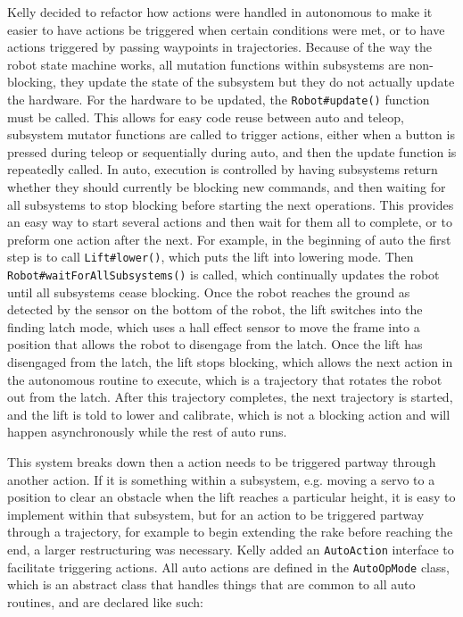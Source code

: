\documentclass{article}
\begin{document}
Kelly decided to refactor how actions were handled in autonomous to make it easier to have actions be triggered when certain conditions were met, or to have actions triggered by passing waypoints in trajectories. Because of the way the robot state machine works, all mutation functions within subsystems are non-blocking, they update the state of the subsystem but they do not actually update the hardware. For the hardware to be updated, the \texttt{Robot\#update()} function must be called. This allows for easy code reuse between auto and teleop, subsystem mutator functions are called to trigger actions, either when a button is pressed during teleop or sequentially during auto, and then the update function is repeatedly called. In auto, execution is controlled by having subsystems return whether they should currently be blocking new commands, and then waiting for all subsystems to stop blocking before starting the next operations. This provides an easy way to start several actions and then wait for them all to complete, or to preform one action after the next. For example, in the beginning of auto the first step is to call \texttt{Lift\#lower()}, which puts the lift into lowering mode. Then \texttt{Robot\#waitForAllSubsystems()} is called, which continually updates the robot until all subsystems cease blocking. Once the robot reaches the ground as detected by the sensor on the bottom of the robot, the lift switches into the finding latch mode, which uses a hall effect sensor to move the frame into a position that allows the robot to disengage from the latch. Once the lift has disengaged from the latch, the lift stops blocking, which allows the next action in the autonomous routine to execute, which is a trajectory that rotates the robot out from the latch. After this trajectory completes, the next trajectory is started, and the lift is told to lower and calibrate, which is not a blocking action and will happen asynchronously while the rest of auto runs. 

This system breaks down then a action needs to be triggered partway through another action. If it is something within a subsystem, e.g. moving a servo to a position to clear an obstacle when the lift reaches a particular height, it is easy to implement within that subsystem, but for an action to be triggered partway through a trajectory, for example to begin extending the rake before reaching the end, a larger restructuring was necessary. Kelly added an \texttt{AutoAction} interface to facilitate triggering actions. All auto actions are defined in the \texttt{AutoOpMode} class, which is an abstract class that handles things that are common to all auto routines, and are declared like such:
\end{document}
